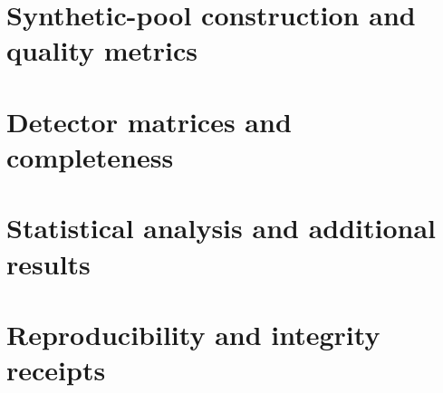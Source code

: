 \documentclass[11pt]{article}
\begin{document}
\section{Synthetic-pool construction and quality metrics}


\section{Detector matrices and completeness}


\section{Statistical analysis and additional results}


\section{Reproducibility and integrity receipts}

\end{document}
